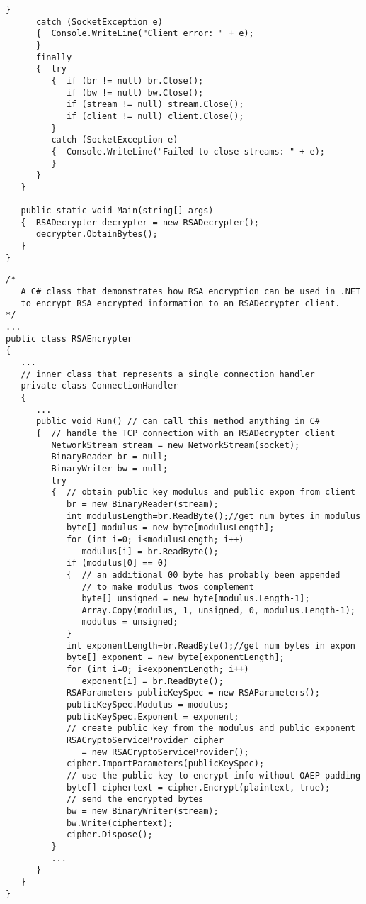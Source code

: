 \begin{lstlisting}[caption=RSA encryption in C\#]
      }
      catch (SocketException e)
      {  Console.WriteLine("Client error: " + e);
      }
      finally
      {  try
         {  if (br != null) br.Close();
            if (bw != null) bw.Close();
            if (stream != null) stream.Close();
            if (client != null) client.Close();
         }
         catch (SocketException e)
         {  Console.WriteLine("Failed to close streams: " + e);
         }
      }
   }

   public static void Main(string[] args)
   {  RSADecrypter decrypter = new RSADecrypter();
      decrypter.ObtainBytes();
   }
}
\end{lstlisting}
\begin{lstlisting}[caption=RSA encryption in .NET]
/*
   A C# class that demonstrates how RSA encryption can be used in .NET
   to encrypt RSA encrypted information to an RSADecrypter client.
*/
...
public class RSAEncrypter
{
   ...
   // inner class that represents a single connection handler
   private class ConnectionHandler
   {
      ...
      public void Run() // can call this method anything in C#
      {  // handle the TCP connection with an RSADecrypter client
         NetworkStream stream = new NetworkStream(socket);
         BinaryReader br = null;
         BinaryWriter bw = null;
         try
         {  // obtain public key modulus and public expon from client
            br = new BinaryReader(stream);
            int modulusLength=br.ReadByte();//get num bytes in modulus
            byte[] modulus = new byte[modulusLength];
            for (int i=0; i<modulusLength; i++)
               modulus[i] = br.ReadByte();
            if (modulus[0] == 0)
            {  // an additional 00 byte has probably been appended
               // to make modulus twos complement
               byte[] unsigned = new byte[modulus.Length-1];
               Array.Copy(modulus, 1, unsigned, 0, modulus.Length-1);
               modulus = unsigned;
            }
            int exponentLength=br.ReadByte();//get num bytes in expon
            byte[] exponent = new byte[exponentLength];
            for (int i=0; i<exponentLength; i++)
               exponent[i] = br.ReadByte();
            RSAParameters publicKeySpec = new RSAParameters();
            publicKeySpec.Modulus = modulus;
            publicKeySpec.Exponent = exponent;
            // create public key from the modulus and public exponent
            RSACryptoServiceProvider cipher
               = new RSACryptoServiceProvider();
            cipher.ImportParameters(publicKeySpec);
            // use the public key to encrypt info without OAEP padding
            byte[] ciphertext = cipher.Encrypt(plaintext, true);
            // send the encrypted bytes
            bw = new BinaryWriter(stream);
            bw.Write(ciphertext);
            cipher.Dispose();
         }
         ...
      }
   }
}
\end{lstlisting}


